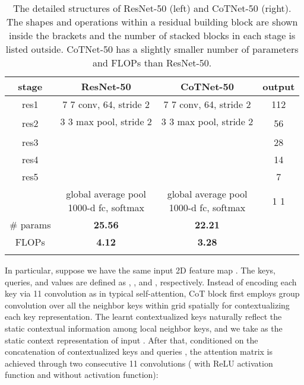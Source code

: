 \documentclass[10pt,twocolumn,letterpaper]{article}
\begin{document}
\begin{table}[!tb]\scriptsize
  \centering
\caption{\small The detailed structures of ResNet-50 (left) and CoTNet-50 (right). The shapes and operations within a residual building block are shown inside the brackets and the number of stacked blocks in each stage is listed outside. CoTNet-50 has a slightly smaller number of parameters and FLOPs than ResNet-50.}
  \setlength\extrarowheight{1.1pt}
\begin{tabular}{c|c|c|c}
\Xhline{2\arrayrulewidth}
stage      & ResNet-50                                  & \textbf{CoTNet-50}        & \!\!output\!\!    \\ \hline
res1       & 7  7 conv, 64, stride 2  & 7  7 conv, 64, stride 2    & \!\!112  112\!\!\\ \hline
\multirow{2}{*}{res2} & 3  3 max pool, stride 2  & 3  3 max pool, stride 2 & \multirow{2}{*}{\!\!56  56\!\!}\\ \cline{2-3}
                      &  
                  &  
                  &      \\ \hline

res3
       & 
       & 
       & \!\!28  28\!\! \\ \hline
res4
       & 
       & 
       & \!\!14  14\!\! \\ \hline
res5
       & 
       & 
       & \!\!7  7\!\! \\ \hline
 & \makecell{global average pool \\ 1000-d fc, softmax} & \makecell{global average pool \\ 1000-d fc, softmax} & 1  1 \\ \hline
\# params                     & \textbf{25.56}          & \textbf{22.21}    &   \\ \hline
FLOPs                         & \textbf{4.12}       & \textbf{3.28}         &   \\ \Xhline{2\arrayrulewidth}
\end{tabular}
\vspace{-0.2in}
\label{table:ResNet}
\end{table}

In particular, suppose we have the same input 2D feature map . The keys, queries, and values are defined as , , and , respectively. Instead of encoding each key via 11 convolution as in typical self-attention, CoT block first employs  group convolution over all the neighbor keys within  grid spatially for contextualizing each key representation. The learnt contextualized keys  naturally reflect the static contextual information among local neighbor keys, and we take  as the static context representation of input . After that, conditioned on the concatenation of contextualized keys  and queries , the attention matrix is achieved through two consecutive 11 convolutions ( with ReLU activation function and  without activation function):
\end{document}
